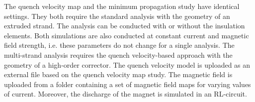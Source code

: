 The quench velocity map and the minimum propagation study have identical settings. They both require the standard analysis with the geometry of an extruded strand. The analysis can be conducted with or without the insulation elements. Both simulations are also conducted at constant current and magnetic field strength, i.e. these parameters do not change for a single analysis. The multi-strand analysis requires the quench velocity-based approach with the geometry of a high-order corrector. The quench velocity model is uploaded as an external file based on the quench velocity map study. The magnetic field is uploaded from a folder containing a set of magnetic field maps for varying values of current. Moreover, the discharge of the magnet is simulated in an RL-circuit.